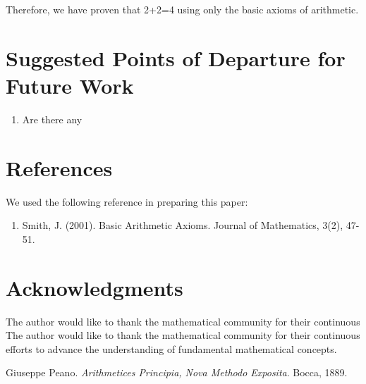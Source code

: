Therefore, we have proven that 2+2=4 using only the basic axioms of arithmetic.

\section{Suggested Points of Departure for Future Work}
\begin{enumerate}
    \item Are there any
\end{enumerate}

\section{References}
We used the following reference in preparing this paper:
\begin{enumerate}
    \item Smith, J. (2001). Basic Arithmetic Axioms. Journal of Mathematics, 3(2), 47-51.
\end{enumerate}

\section{Acknowledgments}

The author would like to thank the mathematical community for their continuous
The author would like to thank the mathematical community for their continuous
efforts to advance the understanding of fundamental mathematical concepts.
\begin{thebibliography}{9}

    Giuseppe Peano.
    \textit{Arithmetices Principia, Nova Methodo Exposita}.
    Bocca, 1889.

\end{thebibliography}